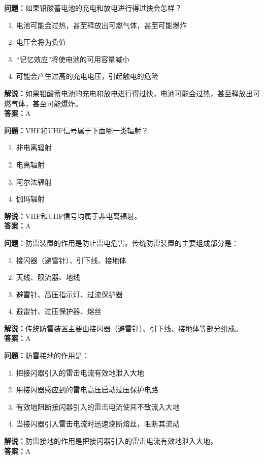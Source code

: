 \documentclass{ctexbook}%
\begin{document}
\textbf{问题：}如果铅酸蓄电池的充电和放电进行得过快会怎样？
\begin{enumerate}[label=\Alph*), leftmargin=3em]
\item 电池可能会过热，甚至释放出可燃气体，甚至可能爆炸
\item 电压会将为负值
\item “记忆效应”将使电池的可用容量减小
\item 可能会产生过高的充电电压，引起触电的危险
\end{enumerate}
\textbf{解说：}如果铅酸蓄电池的充电和放电进行得过快，电池可能会过热，甚至释放出可燃气体，甚至可能爆炸。\\
\textbf{答案：}A

\textbf{问题：}VHF和UHF信号属于下面哪一类辐射？
\begin{enumerate}[label=\Alph*), leftmargin=3em]
\item 非电离辐射
\item 电离辐射
\item 阿尔法辐射
\item 伽玛辐射
\end{enumerate}
\textbf{解说：}VHF和UHF信号均属于非电离辐射。\\
\textbf{答案：}A

\textbf{问题：}防雷装置的作用是防止雷电危害。传统防雷装置的主要组成部分是：
\begin{enumerate}[label=\Alph*), leftmargin=3em]
\item 接闪器（避雷针）、引下线、接地体
\item 天线、限流器、地线
\item 避雷针、高压指示灯、过流保护器
\item 避雷针、过压保护器、熔丝
\end{enumerate}
\textbf{解说：}传统防雷装置主要由接闪器（避雷针）、引下线、接地体等部分组成。\\
\textbf{答案：}A

\textbf{问题：}防雷接地的作用是：
\begin{enumerate}[label=\Alph*), leftmargin=3em]
\item 把接闪器引入的雷击电流有效地泄入大地
\item 用接闪器感应到的雷电高压启动过压保护电路
\item 有效地阻断接闪器引入的雷击电流使其不致流入大地
\item 当接闪器引入雷击电流时迅速烧断熔丝，阻断其流动
\end{enumerate}
\textbf{解说：}防雷接地的作用是把接闪器引入的雷击电流有效地泄入大地。\\
\textbf{答案：}A
\end{document}
